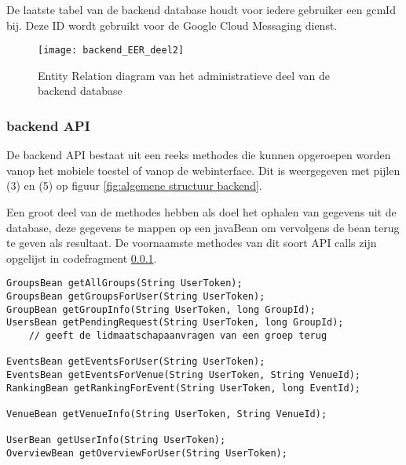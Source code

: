 De laatste tabel van de backend database houdt voor iedere gebruiker een gcmId bij. Deze ID wordt gebruikt voor de Google Cloud Messaging dienst.

\begin{figure}[H]
	\centering
	\texttt{[image: backend\_EER\_deel2]}
	\caption{Entity Relation diagram van het administratieve deel van de backend database}
	\label{fig:Backend ER 2}
\end{figure}

\subsubsection{backend API}
\label{backend API}
De backend API bestaat uit een reeks methodes die kunnen opgeroepen worden vanop het mobiele toestel of vanop de webinterface. Dit is weergegeven met pijlen (3) en (5) op figuur \ref{fig:algemene structuur backend}. 

Een groot deel van de methodes hebben als doel het ophalen van gegevens uit de database, deze gegevens te mappen op een javaBean om vervolgens de bean terug te geven als resultaat. De voornaamste methodes van dit soort API calls zijn opgelijst in codefragment \ref{backend API}.


\begin{lstlisting}[caption={backend API methode signaturen ter opvraging van database informatie},label=lst:backend_api]
GroupsBean getAllGroups(String UserToken);
GroupsBean getGroupsForUser(String UserToken);
GroupBean getGroupInfo(String UserToken, long GroupId);
UsersBean getPendingRequest(String UserToken, long GroupId); 
	// geeft de lidmaatschapaanvragen van een groep terug

EventsBean getEventsForUser(String UserToken);
EventsBean getEventsForVenue(String UserToken, String VenueId);
RankingBean getRankingForEvent(String UserToken, long EventId);

VenueBean getVenueInfo(String UserToken, String VenueId);

UserBean getUserInfo(String UserToken);
OverviewBean getOverviewForUser(String UserToken);
\end{lstlisting}

